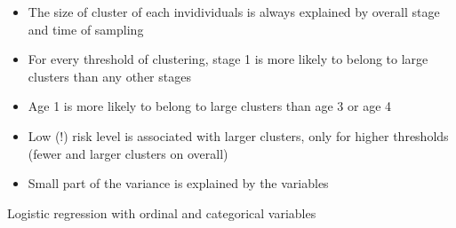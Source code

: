 \documentclass[]{revtex4}\usepackage[]{graphicx}\usepackage[]{color}
\begin{document}
\begin{itemize}
\item The size of cluster of each invidividuals is always explained by overall stage and time of sampling
\item For every threshold of clustering, stage 1 is more likely to belong to large clusters than any other stages
\item Age 1 is more likely to belong to large clusters than age 3 or age 4
\item Low (!) risk level is associated with larger clusters, only for higher thresholds (fewer and larger clusters on overall)
\item Small part of the variance is explained by the variables
\end{itemize}


Logistic regression with ordinal and categorical variables
\end{document}
